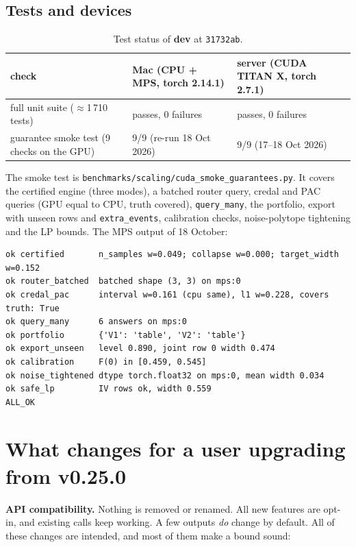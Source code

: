 \documentclass[10pt,a4paper]{article}
\newcommand{\code}[1]{\texttt{#1}}
\newcommand{\new}{\textbf{dev}}
\begin{document}
\subsection{Tests and devices}
\begin{table}[H]\centering\small
\caption{Test status of \new{} at \code{31732ab}.}
\begin{tabular}{lll}\toprule
check & Mac (CPU + MPS, torch 2.14.1) & server (CUDA TITAN X, torch 2.7.1) \\ \midrule
full unit suite ($\approx$1\,710 tests) & passes, 0 failures & passes, 0 failures \\
guarantee smoke test (9 checks on the GPU) & 9/9 (re-run 18 Oct 2026) & 9/9 (17--18 Oct 2026) \\ \bottomrule
\end{tabular}
\end{table}
The smoke test is \code{benchmarks/scaling/cuda\_smoke\_guarantees.py}. It covers the certified engine (three modes), a batched router query, credal and PAC queries (GPU equal to CPU, truth covered), \code{query\_many}, the portfolio, export with unseen rows and \code{extra\_events}, calibration checks, noise-polytope tightening and the LP bounds. The MPS output of 18 October:
\begin{verbatim}
ok certified       n_samples w=0.049; collapse w=0.000; target_width w=0.152
ok router_batched  batched shape (3, 3) on mps:0
ok credal_pac      interval w=0.161 (cpu same), l1 w=0.228, covers truth: True
ok query_many      6 answers on mps:0
ok portfolio       {'V1': 'table', 'V2': 'table'}
ok export_unseen   level 0.890, joint row 0 width 0.474
ok calibration     F(0) in [0.459, 0.545]
ok noise_tightened dtype torch.float32 on mps:0, mean width 0.034
ok safe_lp         IV rows ok, width 0.559
ALL_OK
\end{verbatim}

\section{What changes for a user upgrading from v0.25.0}\label{sec:changes}
\textbf{API compatibility.} Nothing is removed or renamed. All new features are opt-in, and
existing calls keep working. A few outputs \emph{do} change by default. All of these changes
are intended, and most of them make a bound sound:
\end{document}
